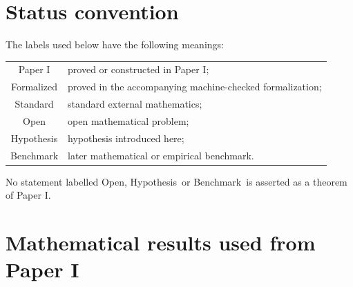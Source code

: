 \documentclass[11pt,a4paper]{article}
\theoremstyle{remark}
\newcommand{\statusPaper}{\textsf{Paper I}}
\newcommand{\statusFormal}{\textsf{Formalized}}
\newcommand{\statusStandard}{\textsf{Standard}}
\newcommand{\statusHypothesis}{\textsf{Hypothesis}}
\newcommand{\statusOpen}{\textsf{Open}}
\newcommand{\statusBenchmark}{\textsf{Benchmark}}
\begin{document}
\begin{abstract}
The Relational Spin-Closure Hypothesis begins only after these distinctions.  It proposes that a future classical configuration space carries a gauge-equivariant constraint whose solution set couples state and geometric variables nontrivially.  The finite-dimensional research programme is deliberately staged: first test algebraic transport compatibility and frustration on a graph; then introduce a controlled driven dynamics with fixed link variables; only afterwards promote the transport variables themselves to dynamical degrees of freedom and test nonlinear back-reaction.  A continuum limit, an effective geometric description, and large-scale gravitational phenomenology come later.  Rotation curves, gravitational lensing, dark-matter phenomenology and MOND-type scaling are therefore late falsification benchmarks, not ingredients of the defining equations.  Quantization and particle interpretations are later still.
\end{abstract}

\tableofcontents
\clearpage

\section{Status convention}

The labels used below have the following meanings:
\begin{center}
\begin{tabular}{cl}
\toprule
\statusPaper & proved or constructed in Paper I;\\
\statusFormal & proved in the accompanying machine-checked formalization;\\
\statusStandard & standard external mathematics;\\
\statusOpen & open mathematical problem;\\
\statusHypothesis & hypothesis introduced here;\\
\statusBenchmark & later mathematical or empirical benchmark.\\
\bottomrule
\end{tabular}
\end{center}
No statement labelled \statusOpen, \statusHypothesis\ or \statusBenchmark\ is asserted as a theorem of Paper I.

\section{Mathematical results used from Paper I}
\end{document}
